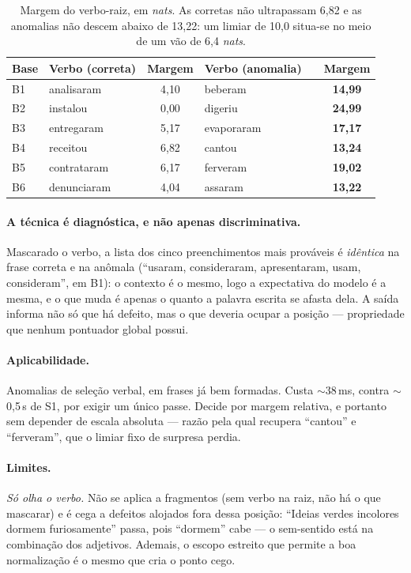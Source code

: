 \documentclass[11pt,a4paper]{article}
\newcommand{\dimtable}[1]{\small #1}
\begin{document}
\begin{table}[H]
\centering
\dimtable{
\begin{tabular}{@{}llcllc@{}}
\toprule
\textbf{Base} & \textbf{Verbo (correta)} & \textbf{Margem} & \textbf{Verbo (anomalia)} & & \textbf{Margem} \\
\midrule
B1 & analisaram  & 4{,}10 & beberam    & & \textbf{14{,}99} \\
B2 & instalou    & 0{,}00 & digeriu    & & \textbf{24{,}99} \\
B3 & entregaram  & 5{,}17 & evaporaram & & \textbf{17{,}17} \\
B4 & receitou    & 6{,}82 & cantou     & & \textbf{13{,}24} \\
B5 & contrataram & 6{,}17 & ferveram   & & \textbf{19{,}02} \\
B6 & denunciaram & 4{,}04 & assaram    & & \textbf{13{,}22} \\
\bottomrule
\end{tabular}}
\caption{Margem do verbo-raiz, em \textit{nats}. As corretas não ultrapassam 6,82 e as anomalias não
descem abaixo de 13,22: um limiar de 10,0 situa-se no meio de um vão de 6,4 \textit{nats}.}
\label{tab:margens}
\end{table}

\paragraph{A técnica é diagnóstica, e não apenas discriminativa.} Mascarado o verbo, a lista dos
cinco preenchimentos mais prováveis é \emph{idêntica} na frase correta e na anômala (``usaram,
consideraram, apresentaram, usam, consideram'', em B1): o contexto é o mesmo, logo a expectativa do
modelo é a mesma, e o que muda é apenas o quanto a palavra escrita se afasta dela. A saída informa
não só que há defeito, mas o que deveria ocupar a posição --- propriedade que nenhum pontuador
global possui.

\paragraph{Aplicabilidade.} Anomalias de seleção verbal, em frases já bem formadas. Custa
$\sim$38\,ms, contra $\sim$0,5\,s de S1, por exigir um único passe. Decide por margem relativa, e
portanto sem depender de escala absoluta --- razão pela qual recupera ``cantou'' e ``ferveram'',
que o limiar fixo de surpresa perdia.

\paragraph{Limites.} \emph{Só olha o verbo.} Não se aplica a fragmentos (sem verbo na raiz, não há o
que mascarar) e é cega a defeitos alojados fora dessa posição: ``Ideias verdes incolores dormem
furiosamente'' passa, pois ``dormem'' cabe --- o sem-sentido está na combinação dos adjetivos.
Ademais, o escopo estreito que permite a boa normalização é o mesmo que cria o ponto cego.
\end{document}
